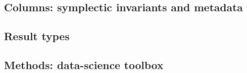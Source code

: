 \subsection{Columns: symplectic invariants and metadata}\label{subsec:black-box-datascience-columns-symplectic-invariants-and-metadata}
%
%
\subsection{Result types}\label{subsec:black-box-datascience-result-types}
%
%
%
%
%
\subsection{Methods: data-science toolbox}\label{subsec:black-box-datascience-methods-data-science-toolbox}
%
%
